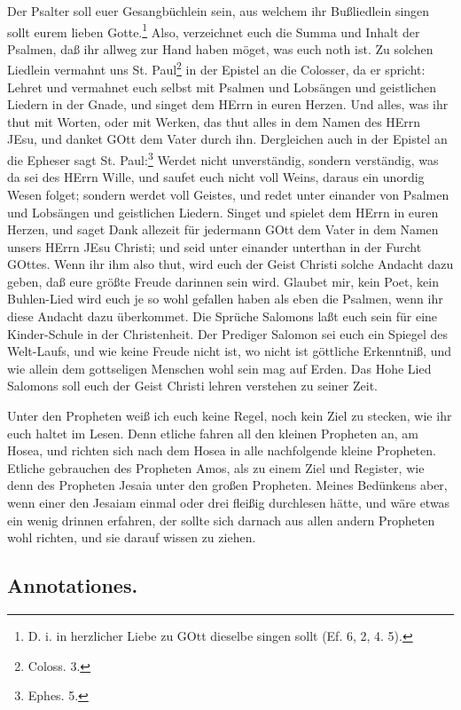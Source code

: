Der Psalter soll euer Gesangbüchlein sein, aus welchem ihr Bußliedlein singen sollt eurem lieben Gotte.\footnote{D. i. in herzlicher Liebe zu GOtt dieselbe singen sollt (Ef. 6, 2, 4. 5).} Also, verzeichnet euch die Summa und Inhalt der Psalmen, daß ihr allweg zur Hand haben möget, was euch noth ist. Zu solchen Liedlein vermahnt uns St. Paul\footnote{Coloss. 3.} in der Epistel
an die Colosser, da er spricht: Lehret und vermahnet euch selbst mit Psalmen und Lobsängen und geistlichen Liedern in der Gnade, und singet dem HErrn in euren Herzen. Und alles, was ihr thut mit Worten, oder mit Werken, das thut alles in dem Namen des HErrn JEsu, und danket GOtt dem Vater durch ihn. Dergleichen auch in der Epistel an die Epheser sagt St. Paul:\footnote{Ephes. 5.} Werdet nicht unverständig, sondern verständig, was da sei des HErrn Wille, und saufet euch nicht voll Weins, daraus ein unordig Wesen folget; sondern werdet voll Geistes, und redet unter einander von Psalmen und Lobsängen und geistlichen Liedern. Singet und spielet dem HErrn in euren Herzen, und saget Dank allezeit für jedermann GOtt dem Vater in dem Namen unsers HErrn JEsu Christi; und seid unter einander unterthan in der Furcht GOttes. Wenn ihr ihm also thut, wird euch der Geist Christi solche Andacht dazu geben, daß eure größte Freude darinnen sein wird. Glaubet mir, kein Poet, kein Buhlen-Lied wird euch je so wohl gefallen haben als eben die Psalmen, wenn ihr diese Andacht dazu überkommet. Die Sprüche Salomons laßt euch sein für eine Kinder-Schule in der Christenheit. Der Prediger Salomon sei euch ein Spiegel des Welt-Laufs, und wie keine Freude nicht ist, wo nicht ist göttliche Erkenntniß, und wie allein dem gottseligen Menschen wohl sein mag auf Erden. Das Hohe Lied Salomons soll euch der Geist Christi lehren verstehen zu seiner Zeit.

Unter den Propheten weiß ich euch keine Regel, noch kein Ziel zu stecken, wie ihr euch haltet im Lesen. Denn etliche fahren all den kleinen Propheten an, am Hosea, und richten sich nach dem Hosea in alle nachfolgende kleine Propheten. Etliche gebrauchen des Propheten Amos, als zu einem Ziel und Register, wie denn des Propheten Jesaia unter den großen Propheten. Meines Bedünkens aber, wenn einer den
Jesaiam einmal oder drei fleißig durchlesen hätte, und wäre etwas ein wenig drinnen erfahren, der sollte sich darnach aus allen andern Propheten wohl richten, und sie darauf wissen zu ziehen.

\subsection*{Annotationes.}

